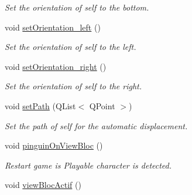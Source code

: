 \begin{DoxyCompactItemize}
\begin{DoxyCompactList}\small\item\em Set the orientation of self to the bottom. \end{DoxyCompactList}\item 
\hypertarget{class_ennemi_ac455b7c41a46dc42a27841b9c566e329}{}void \hyperlink{class_ennemi_ac455b7c41a46dc42a27841b9c566e329}{set\+Orientation\+\_\+left} ()\label{class_ennemi_ac455b7c41a46dc42a27841b9c566e329}

\begin{DoxyCompactList}\small\item\em Set the orientation of self to the left. \end{DoxyCompactList}\item 
\hypertarget{class_ennemi_a4e99225c7a632efceebba66996d7d9ee}{}void \hyperlink{class_ennemi_a4e99225c7a632efceebba66996d7d9ee}{set\+Orientation\+\_\+right} ()\label{class_ennemi_a4e99225c7a632efceebba66996d7d9ee}

\begin{DoxyCompactList}\small\item\em Set the orientation of self to the right. \end{DoxyCompactList}\item 
\hypertarget{class_ennemi_a482e9c5ccc0cf1c3aa4e83f32f3eedb1}{}void \hyperlink{class_ennemi_a482e9c5ccc0cf1c3aa4e83f32f3eedb1}{set\+Path} (Q\+List$<$ Q\+Point $>$)\label{class_ennemi_a482e9c5ccc0cf1c3aa4e83f32f3eedb1}

\begin{DoxyCompactList}\small\item\em Set the path of self for the automatic displacement. \end{DoxyCompactList}\item 
void \hyperlink{class_ennemi_a6811b0a25a92ec210750072b83d1f74e}{pinguin\+On\+View\+Bloc} ()
\begin{DoxyCompactList}\small\item\em Restart game is Playable character is detected. \end{DoxyCompactList}\item 
\hypertarget{class_ennemi_ad4861b8a3ad9d4819d3716ac3d0e8501}{}void \hyperlink{class_ennemi_ad4861b8a3ad9d4819d3716ac3d0e8501}{view\+Bloc\+Actif} ()\label{class_ennemi_ad4861b8a3ad9d4819d3716ac3d0e8501}


\end{DoxyCompactItemize}
